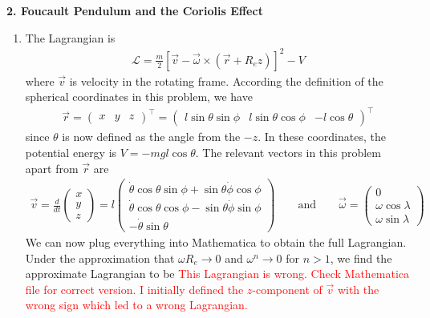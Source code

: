 \documentclass{article}
\theoremstyle{definition}
\newcommand{\lag}{\mathcal{L}}
\newcommand{\f}[2]{\frac{#1}{#2}}
\newcommand{\lb}{\left[}
\newcommand{\rb}{\right]}
\begin{document}
\newpage







\noindent \textbf{2. Foucault Pendulum and the Coriolis Effect}

\begin{enumerate}[label=(\alph*)]
	\item The Lagrangian is 
	\begin{align*}
	\lag = \f{m}{2}\lb \vec{v} - \vec{\omega} \times (\vec{r} + R_e \hat{z})  \rb^2 -V
	\end{align*}
	where $\vec{v}$ is velocity in the rotating frame. According the definition of the spherical coordinates in this problem, we have
	\begin{align*}
	\vec{r} = \begin{pmatrix}
	x & y & z
	\end{pmatrix}^\top
	= 
	\begin{pmatrix}
	l\sin\theta\sin\phi & 
	l\sin\theta\cos\phi &
	-l\cos\theta
	\end{pmatrix}^\top
	\end{align*}
	since $\theta$ is now defined as the angle from the $-\hat{z}$. In these coordinates, the potential energy is $V = -mgl\cos\theta$. The relevant vectors in this problem apart from $\vec{r}$ are
	\begin{align*}
	\vec{v} = \f{d}{dt}\begin{pmatrix}
	x\\y\\z
	\end{pmatrix} = 
	l\begin{pmatrix}
	\dot\theta \cos \theta \sin\phi+\sin\theta\dot\phi\cos\phi \\
	\dot\theta \cos\theta \cos\phi-\sin
	\theta \dot\phi \sin\phi\\
	-\dot\theta \sin \theta
	\end{pmatrix}
	\quad \quad \text{and} \quad\quad
	\vec{\omega} = \begin{pmatrix}
	0 \\ \omega \cos\lambda \\ \omega\sin\lambda
	\end{pmatrix}
	\end{align*}
	We can now plug everything into Mathematica to obtain the full Lagrangian. Under the approximation that $\omega R_e \to 0$ and $\omega^n \to 0$ for $n > 1$, we find the approximate Lagrangian to be \textcolor{red}{This Lagrangian is wrong. Check Mathematica file for correct version. I initially defined the $z$-component of $\vec{v}$ with the wrong sign which led to a wrong Lagrangian.}

\end{enumerate}
\end{document}
